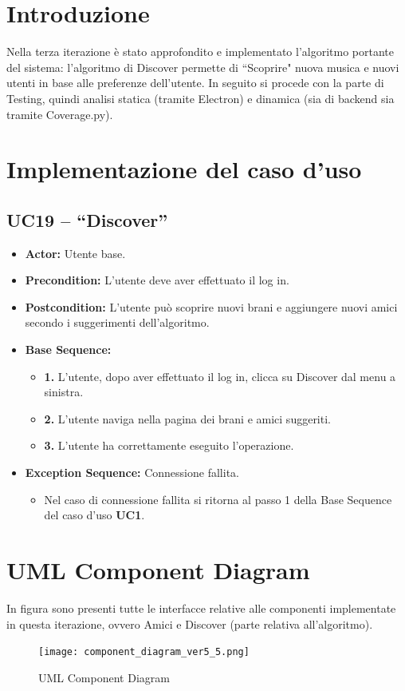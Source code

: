 \section{Introduzione}
Nella terza iterazione è stato approfondito e implementato l'algoritmo portante del sistema: l'algoritmo di Discover permette di ``Scoprire" nuova 
musica e nuovi utenti in base alle preferenze dell'utente.
In seguito si procede con la parte di Testing, quindi analisi statica (tramite Electron) e dinamica (sia di backend sia tramite Coverage.py).


\section{Implementazione del caso d'uso}
\subsection{UC19 -- ``Discover''}
\begin{itemize}
    \item \textbf{Actor:} Utente base.
    \item \textbf{Precondition:} L'utente deve aver effettuato il log in.
    \item \textbf{Postcondition:} L'utente può scoprire nuovi brani e aggiungere nuovi amici secondo i suggerimenti dell'algoritmo. 
    \item \textbf{Base Sequence:}
    \begin{itemize}
        \item \textbf{1.} L'utente, dopo aver effettuato il log in, clicca su Discover dal menu a sinistra.
        \item \textbf{2.} L'utente naviga nella pagina dei brani e amici suggeriti.
        \item \textbf{3.} L'utente ha correttamente eseguito l'operazione.
    \end{itemize}
    \item \textbf{Exception Sequence:} Connessione fallita.
    \begin{itemize}
        \item Nel caso di connessione fallita si ritorna al passo 1 della Base Sequence del caso d'uso \textbf{UC1}.
    \end{itemize}
\end{itemize}
\vspace{1cm}

\section{UML Component Diagram}
In figura sono presenti tutte le interfacce
relative alle componenti implementate in questa iterazione, 
ovvero Amici e Discover (parte relativa all'algoritmo).
\begin{figure}[H]
    \centering
    \texttt{[image: component\_diagram\_ver5\_5.png]} 
    \caption{UML Component Diagram}
    \label{fig-uml-component-diag_5}
\end{figure}

